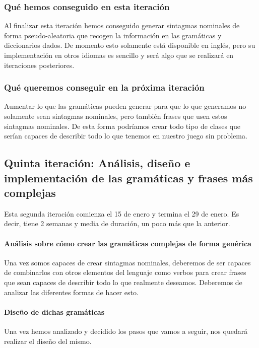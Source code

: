 \subsubsection{Qué hemos conseguido en esta iteración}

Al finalizar esta iteración hemos conseguido generar sintagmas nominales de forma pseudo-aleatoria que recogen la información en las gramáticas y diccionarios dados. De momento esto solamente está disponible en inglés, pero su implementación en otros idiomas es sencillo y será algo que se realizará en iteraciones posteriores.

\subsubsection{Qué queremos conseguir en la próxima iteración}

Aumentar lo que las gramáticas pueden generar para que lo que generamos no solamente sean sintagmas nominales, pero también frases que usen estos sintagmas nominales. De esta forma podríamos crear todo tipo de clases que serían capaces de describir todo lo que tenemos en nuestro juego sin problema.

\subsection{Quinta iteración: Análisis, diseño e implementación de las gramáticas y frases más complejas}

Esta segunda iteración comienza el 15 de enero y termina el 29 de enero. Es decir, tiene 2 semanas y media de duración, un poco más que la anterior.

\paragraph{Análisis sobre cómo crear las gramáticas complejas de forma genérica} Una vez somos capaces de crear sintagmas nominales, deberemos de ser capaces de combinarlos con otros elementos del lenguaje como verbos para crear frases que sean capaces de describir todo lo que realmente deseamos. Deberemos de analizar las diferentes formas de hacer esto.

\paragraph{Diseño de dichas gramáticas} Una vez hemos analizado y decidido los pasos que vamos a seguir, nos quedará realizar el diseño del mismo.


